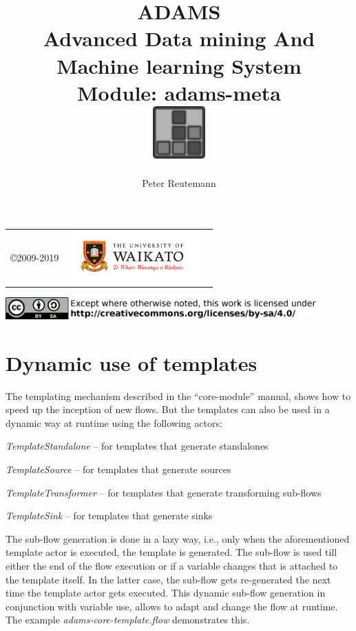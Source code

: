 \documentclass[a4paper]{book}
\title{
  \textbf{ADAMS} \\
  {\Large \textbf{A}dvanced \textbf{D}ata mining \textbf{A}nd \textbf{M}achine
  learning \textbf{S}ystem} \\
  {\Large Module: adams-meta} \\
  \vspace{1cm}
  \includegraphics[width=2cm]{images/meta-module.png} \\
}
\author{
  Peter Reutemann
}
\begin{document}
\begin{titlepage}
\maketitle

\thispagestyle{empty}
\center
\begin{table}[b]
	\begin{tabular}{c l l}
		\parbox[c][2cm]{2cm}{\copyright 2009-2019} &
		\parbox[c][2cm]{5cm}{\includegraphics[width=5cm]{images/coat_of_arms.pdf}} \\
	\end{tabular}
	\includegraphics[width=12cm]{images/cc.png} \\
\end{table}

\end{titlepage}

\tableofcontents
\listoffigures



\newpage
\chapter{Dynamic use of templates}
\label{dynamic}
The templating mechanism described in the ``core-module'' manual, shows how to 
speed up the inception of new flows. But the templates can also be used in a
dynamic way at runtime using the following actors:
\begin{tight_itemize}
	\item \textit{TemplateStandalone} -- for templates that generate standalones
	\item \textit{TemplateSource} -- for templates that generate sources
	\item \textit{TemplateTransformer} -- for templates that generate transforming
	sub-flows
	\item \textit{TemplateSink} -- for templates that generate sinks
\end{tight_itemize}
The sub-flow generation is done in a lazy way, i.e., only when the
aforementioned template actor is executed, the template is generated. The
sub-flow is used till either the end of the flow execution or if a variable
changes that is attached to the template itself. In the latter case, the
sub-flow gets re-generated the next time the template actor gets executed. This
dynamic sub-flow generation in conjunction with variable use, allows to adapt
and change the flow at runtime. The example \textit{adams-core-template.flow}
demonstrates this.
\end{document}
